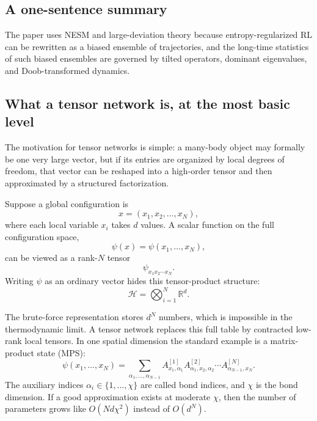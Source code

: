 \documentclass[11pt]{article}
\begin{document}
\subsection*{A one-sentence summary}

The paper uses NESM and large-deviation theory because entropy-regularized RL can be
rewritten as a biased ensemble of trajectories, and the long-time statistics of such biased
ensembles are governed by tilted operators, dominant eigenvalues, and Doob-transformed
dynamics.

\subsection*{What a tensor network is, at the most basic level}

The motivation for tensor networks is simple: a many-body object may formally be one very
large vector, but if its entries are organized by local degrees of freedom, that vector can be
reshaped into a high-order tensor and then approximated by a structured factorization.

Suppose a global configuration is
\begin{equation}
    x=(x_1,x_2,\dots,x_N),
\end{equation}
where each local variable \(x_i\) takes \(d\) values. A scalar function on the full
configuration space,
\begin{equation}
    \psi(x)=\psi(x_1,\dots,x_N),
\end{equation}
can be viewed as a rank-\(N\) tensor
\begin{equation}
    \psi_{x_1x_2\cdots x_N}.
\end{equation}
Writing \(\psi\) as an ordinary vector hides this tensor-product structure:
\begin{equation}
    \mathcal H = \bigotimes_{i=1}^{N} \mathbb{R}^{d}.
\end{equation}

The brute-force representation stores \(d^N\) numbers, which is impossible in the
thermodynamic limit. A tensor network replaces this full table by contracted low-rank local
tensors. In one spatial dimension the standard example is a matrix-product state (MPS):
\begin{equation}
    \psi(x_1,\dots,x_N)
    =
    \sum_{\alpha_1,\dots,\alpha_{N-1}}
    A^{[1]}_{x_1,\alpha_1}
    A^{[2]}_{\alpha_1,x_2,\alpha_2}
    \cdots
    A^{[N]}_{\alpha_{N-1},x_N}.
\end{equation}
The auxiliary indices \(\alpha_i\in\{1,\dots,\chi\}\) are called bond indices, and \(\chi\) is
the bond dimension. If a good approximation exists at moderate \(\chi\), then the number of
parameters grows like \(O(Nd\chi^2)\) instead of \(O(d^N)\).
\end{document}
